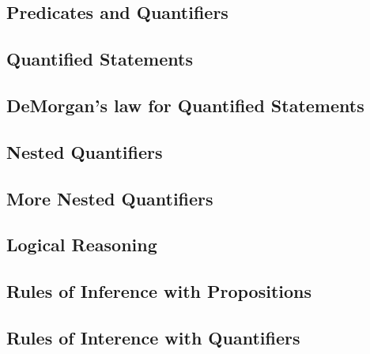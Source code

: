 \documentclass{article}
\begin{document}
\subsection{Predicates and Quantifiers}
\subsection{Quantified Statements}
\subsection{DeMorgan's law for Quantified Statements}
\subsection{Nested Quantifiers}
\subsection{More Nested Quantifiers}
\subsection{Logical Reasoning}
\subsection{Rules of Inference with Propositions}
\subsection{Rules of Interence with Quantifiers}
\end{document}
